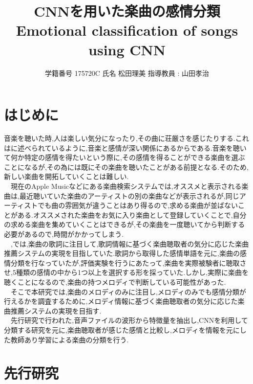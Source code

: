 \documentclass[twocolumn,twoside,9.5pt]{jarticle}
\begin{document}
\title{CNNを用いた楽曲の感情分類\\Emotional classification of songs using CNN}
\author{学籍番号 {175720C} 氏名 {松田理美} 指導教員 : 山田孝治}
\date{}
\maketitle
\thispagestyle{fancy} 

\section{はじめに}
音楽を聴いた時,人は楽しい気分になったり,その曲に荘厳さを感じたりする.これは\cite{ogushi}に述べられているように,音楽と感情が深い関係にあるからである.音楽を聴いて何か特定の感情を得たいという際に,その感情を得ることができる楽曲を選ぶことになるが,その為には既にその楽曲を聴いたことがある前提となる.そのため,新しい楽曲を開拓していくことは難しい.\\
　現在のApple Musicなどにある楽曲検索システムでは,オススメと表示される楽曲は,最近聴いていた楽曲のアーティストの別の楽曲などが表示されるが,同じアーティストでも曲の雰囲気が違うことはあり得るので,求める楽曲が並ばないことがある.オススメされた楽曲をお気に入り楽曲として登録していくことで,自分の求める楽曲を集めていくことはできるが,その楽曲を一度聴いてから判断する必要があるので,時間がかかってしまう.\\
　\cite{gushiken1},\cite{gushiken2}では,楽曲の歌詞に注目して,歌詞情報に基づく楽曲聴取者の気分に応じた楽曲推薦システムの実現を目指していた.歌詞から取得した感情単語を元に,楽曲の感情分類を行なっていたが,評価実験を行うにあたって,楽曲を実際被験者に聴取させ,5種類の感情の中から1つ以上を選択する形を採っていた.しかし,実際に楽曲を聴くことになるので,楽曲の持つメロディで判断している可能性があった.\\
　そこで本研究では,楽曲のメロディのみに注目し,メロディのみでも感情分類が行えるかを調査するために,メロディ情報に基づく楽曲聴取者の気分に応じた楽曲推薦システムの実現を目指す.\\
　先行研究で行われた,音声ファイルの波形から特徴量を抽出し,CNNを利用して分類する研究を元に,楽曲聴取者が感じた感情と比較し,メロディを情報を元にした教師あり学習による楽曲の分類を行う.
\section{先行研究}
\end{document}
